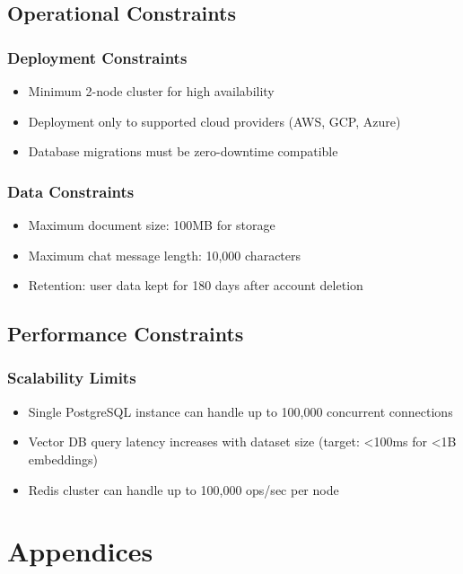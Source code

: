 \documentclass{report}
\begin{document}
\section{Operational Constraints}

\subsection{Deployment Constraints}
\begin{itemize}
    \item Minimum 2-node cluster for high availability
    \item Deployment only to supported cloud providers (AWS, GCP, Azure)
    \item Database migrations must be zero-downtime compatible
\end{itemize}

\subsection{Data Constraints}
\begin{itemize}
    \item Maximum document size: 100MB for storage
    \item Maximum chat message length: 10,000 characters
    \item Retention: user data kept for 180 days after account deletion
\end{itemize}

\section{Performance Constraints}

\subsection{Scalability Limits}
\begin{itemize}
    \item Single PostgreSQL instance can handle up to 100,000 concurrent connections
    \item Vector DB query latency increases with dataset size (target: <100ms for <1B embeddings)
    \item Redis cluster can handle up to 100,000 ops/sec per node
\end{itemize}

\chapter{Appendices}
\end{document}
